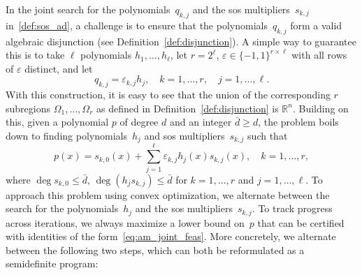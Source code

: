 \documentclass[12pt]{article}
\newcommand{\reals}{\mathbb{R}}
\newcommand{\SOS}{\mathbf{\Sigma}}
\theoremstyle{remark}
\begin{document}
In the joint search for the polynomials~$q_{k,j}$ and the sos multipliers~$s_{k,j}$ in~\eqref{def:sos_ad}, a challenge is to ensure that the polynomials~$q_{k,j}$ form a valid algebraic disjunction (see Definition~\ref{def:disjunction}). 
A simple way to guarantee this is to take $\ell$ polynomials $h_1,\ldots, h_{\ell}$, let $r=2^{\ell}$, $\varepsilon \in \{-1,1\}^{r \times \ell}$ with all rows of $\varepsilon$ distinct, and let 
\[q_{k,j}=\varepsilon_{k,j}h_j,\quad k=1,\ldots,r, \quad j=1,\ldots,\ell.\]
With this construction, it is easy to see that the union of the corresponding $r$ subregions $\Omega_1,\ldots,\Omega_r$ as defined in Definition~\ref{def:disjunction} is $\reals^n$.
Building on this, given a polynomial $p$ of degree $d$ and an integer $\bar{d}\ge d$, the problem boils down to finding polynomials~$h_j$ and sos multipliers~$s_{k,j}$ such that
\begin{equation}\label{eq:am_joint_feas}
		p(x) =s_{k,0}(x)+\sum\limits_{j=1}^{\ell} \varepsilon_{k,j}h_j(x)s_{k,j}(x),\quad  k=1,\ldots,r,    
\end{equation}
where $\deg s_{k,0}\le \bar{d}$, 
$\deg(h_js_{k,j})\le \bar{d}$ for $k=1,\ldots,r$ and $j=1,\ldots,\ell$. 
To approach this problem using convex optimization, we alternate between the search for the polynomials~$h_j$ and the sos multipliers~$s_{k,j}$. 
To track progress across iterations, we always maximize a lower bound on~$p$ that can be certified with identities of the form~\eqref{eq:am_joint_feas}. 
More concretely, we alternate between the following two steps, which can both be reformulated as a semidefinite program:
\end{document}
